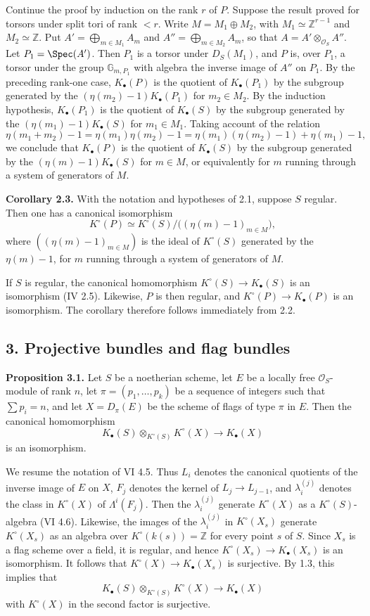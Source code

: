 Continue the proof by induction on the rank $r$ of $P$. Suppose the result proved for torsors under split tori of rank $<r$. Write $M=M_1\oplus M_2$, with $M_1\simeq\mathbb Z^{r-1}$ and $M_2\simeq\mathbb Z$. Put $A'=\bigoplus_{m\in M_1}A_m$ and $A''=\bigoplus_{m\in M_2}A_m$, so that $A=A'\otimes_{\mathcal O_S}A''$.
Let $P_1=\Spec(A')$. Then $P_1$ is a torsor under $D_S(M_1)$, and $P$ is, over $P_1$, a torsor under the group $\mathbb G_{m,P_1}$ with algebra the inverse image of $A''$ on $P_1$. By the preceding rank-one case, $K_\bullet(P)$ is the quotient of $K_\bullet(P_1)$ by the subgroup generated by the $(\eta(m_2)-1)K_\bullet(P_1)$ for $m_2\in M_2$. By the induction hypothesis, $K_\bullet(P_1)$ is the quotient of $K_\bullet(S)$ by the subgroup generated by the $(\eta(m_1)-1)K_\bullet(S)$ for $m_1\in M_1$. Taking account of the relation
\[
 \eta(m_1+m_2)-1=\eta(m_1)\eta(m_2)-1
 =\eta(m_1)(\eta(m_2)-1)+\eta(m_1)-1,
\]
we conclude that $K_\bullet(P)$ is the quotient of $K_\bullet(S)$ by the subgroup generated by the $(\eta(m)-1)K_\bullet(S)$ for $m\in M$, or equivalently for $m$ running through a system of generators of $M$.

\textbf{Corollary 2.3.} With the notation and hypotheses of 2.1, suppose $S$ regular. Then one has a canonical isomorphism
\[
 K^\circ(P)\simeq K^\circ(S)/\bigl((\eta(m)-1)_{m\in M}\bigr),
\]
where $((\eta(m)-1)_{m\in M})$ is the ideal of $K^\circ(S)$ generated by the $\eta(m)-1$, for $m$ running through a system of generators of $M$.

If $S$ is regular, the canonical homomorphism $K^\circ(S)\to K_\bullet(S)$ is an isomorphism (IV 2.5). Likewise, $P$ is then regular, and $K^\circ(P)\to K_\bullet(P)$ is an isomorphism. The corollary therefore follows immediately from 2.2.

\subsection*{3. Projective bundles and flag bundles}

\textbf{Proposition 3.1.} Let $S$ be a noetherian scheme, let $E$ be a locally free $\mathcal O_S$-module of rank $n$, let $\pi=(p_1,\ldots,p_k)$ be a sequence of integers such that $\sum p_i=n$, and let $X=D_\pi(E)$ be the scheme of flags of type $\pi$ in $E$. Then the canonical homomorphism
\[
 K_\bullet(S)\otimes_{K^\circ(S)}K^\circ(X)\longrightarrow K_\bullet(X)
\]
is an isomorphism.

We resume the notation of VI 4.5. Thus $L_i$ denotes the canonical quotients of the inverse image of $E$ on $X$, $F_j$ denotes the kernel of $L_j\to L_{j-1}$, and $\lambda_i^{(j)}$ denotes the class in $K^\circ(X)$ of $\Lambda^i(F_j)$. Then the $\lambda_i^{(j)}$ generate $K^\circ(X)$ as a $K^\circ(S)$-algebra (VI 4.6). Likewise, the images of the $\lambda_i^{(j)}$ in $K^\circ(X_s)$ generate $K^\circ(X_s)$ as an algebra over $K^\circ(k(s))=\mathbb Z$ for every point $s$ of $S$. Since $X_s$ is a flag scheme over a field, it is regular, and hence $K^\circ(X_s)\to K_\bullet(X_s)$ is an isomorphism. It follows that $K^\circ(X)\to K_\bullet(X_s)$ is surjective. By 1.3, this implies that
\[
 K_\bullet(S)\otimes_{K^\circ(S)}K^\circ(X)\longrightarrow K_\bullet(X)
\]
with $K^\circ(X)$ in the second factor is surjective.


